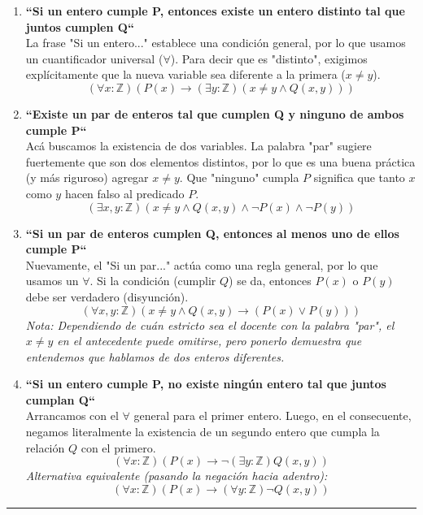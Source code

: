 \begin{enumerate}[label=\textbf{\alph*)}]

    \item \textbf{“Si un entero cumple P, entonces existe un entero distinto tal que juntos cumplen Q“} \\
    La frase "Si un entero..." establece una condición general, por lo que usamos un cuantificador universal ($\forall$). Para decir que es "distinto", exigimos explícitamente que la nueva variable sea diferente a la primera ($x \neq y$).
    \[ (\forall x: \mathbb{Z})(P(x) \rightarrow (\exists y: \mathbb{Z})(x \neq y \wedge Q(x, y))) \]

    \vspace{0.4cm}
    \item \textbf{“Existe un par de enteros tal que cumplen Q y ninguno de ambos cumple P“} \\
    Acá buscamos la existencia de dos variables. La palabra "par" sugiere fuertemente que son dos elementos distintos, por lo que es una buena práctica (y más riguroso) agregar $x \neq y$. Que "ninguno" cumpla $P$ significa que tanto $x$ como $y$ hacen falso al predicado $P$.
    \[ (\exists x, y: \mathbb{Z})(x \neq y \wedge Q(x, y) \wedge \neg P(x) \wedge \neg P(y)) \]

    \vspace{0.4cm}
    \item \textbf{“Si un par de enteros cumplen Q, entonces al menos uno de ellos cumple P“} \\
    Nuevamente, el "Si un par..." actúa como una regla general, por lo que usamos un $\forall$. Si la condición (cumplir $Q$) se da, entonces $P(x)$ o $P(y)$ debe ser verdadero (disyunción).
    \[ (\forall x, y: \mathbb{Z})(x \neq y \wedge Q(x, y) \rightarrow (P(x) \vee P(y))) \]
    \textit{Nota: Dependiendo de cuán estricto sea el docente con la palabra "par", el $x \neq y$ en el antecedente puede omitirse, pero ponerlo demuestra que entendemos que hablamos de dos enteros diferentes.}

    \vspace{0.4cm}
    \item \textbf{“Si un entero cumple P, no existe ningún entero tal que juntos cumplan Q“} \\
    Arrancamos con el $\forall$ general para el primer entero. Luego, en el consecuente, negamos literalmente la existencia de un segundo entero que cumpla la relación $Q$ con el primero.
    \[ (\forall x: \mathbb{Z})(P(x) \rightarrow \neg (\exists y: \mathbb{Z}) Q(x, y)) \]
    \textit{Alternativa equivalente (pasando la negación hacia adentro):} 
    \[ (\forall x: \mathbb{Z})(P(x) \rightarrow (\forall y: \mathbb{Z}) \neg Q(x, y)) \]

\end{enumerate}

\vspace{0.5cm}
\hrule
\vspace{0.5cm}